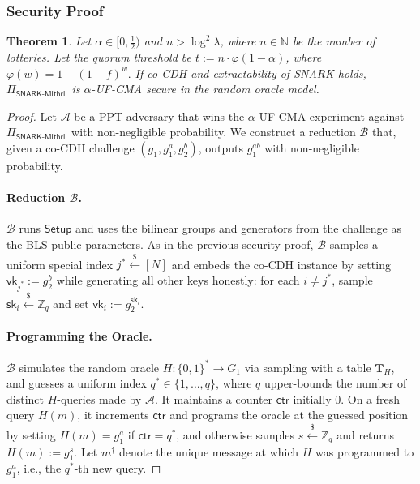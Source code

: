 \documentclass{article}
\newtheorem{theorem}{Theorem}[section]
\newcommand{\pp}[0]{\mathsf{pp}}
\newcommand{\sk}[0]{\mathsf{sk}}
\newcommand{\vk}[0]{\mathsf{vk}}
\newcommand{\getsr}{\xleftarrow{\$}}
\newcommand{\ctr}{\mathsf{ctr}}
\begin{document}
\subsubsection{Security Proof}
\begin{theorem}
Let $\alpha\in[0,\tfrac12)$ and $n>\log^2\lambda$, where $n\in\mathbb{N}$ be the number of lotteries. Let the quorum threshold be $t :=  n\cdot \varphi(1-\alpha)$, where $\varphi(w) = 1-(1-f)^w.$ 
If co-\textsf{CDH} and extractability of SNARK holds, $\Pi_{\mathsf{SNARK\text{-}Mithril}}$ is $\alpha$-\textsf{UF-CMA} secure in the random oracle model.
\end{theorem}

\begin{proof}
Let $\mathcal{A}$ be a PPT adversary that wins the $\alpha$-\textsf{UF-CMA} experiment against $\Pi_{\mathsf{SNARK\text{-}Mithril}}$ with non-negligible probability. We construct a reduction $\mathcal{B}$ that, given a co-\textsf{CDH} challenge $(g_1,g_1^{a},g_2^{b})$, outputs $g_1^{ab}$ with non-negligible probability.

\paragraph{Reduction $\mathcal{B}$.}
$\mathcal{B}$ runs $\mathsf{Setup}$ and uses the bilinear groups and generators from the challenge as the BLS public parameters. As in the previous security proof, $\mathcal{B}$ samples a uniform special index $j^\ast \getsr [N]$ and embeds the co-\textsf{CDH} instance by setting $\vk_{j^\ast}:=g_2^{b}$ while generating all other keys honestly: for each $i\neq j^\ast$, sample $\sk_i\getsr\mathbb{Z}_q$ and set $\vk_i:=g_2^{\sk_i}$. 

\paragraph{Programming the Oracle.}
$\mathcal{B}$ simulates the random oracle $H:\{0,1\}^\ast\to G_1$ via  sampling with a table $\mathbf{T}_H$, and guesses a uniform index $q^\ast\in\{1,\dots,q\}$, where $q$ upper-bounds the number of distinct $H$-queries made by $\mathcal{A}$. It maintains a counter $\ctr$ initially $0$. On a fresh query $H(m)$, it increments $\ctr$ and programs the oracle at the guessed position by setting $H(m)=g_1^{a}$ if $\ctr=q^\ast$, and otherwise samples $s\getsr\mathbb{Z}_q$ and returns $H(m):=g_1^{s}$. Let $m^\dagger$ denote the unique message at which $H$ was programmed to $g_1^{a}$, i.e., the $q^\ast$-th new query.


\end{proof}
\end{document}
